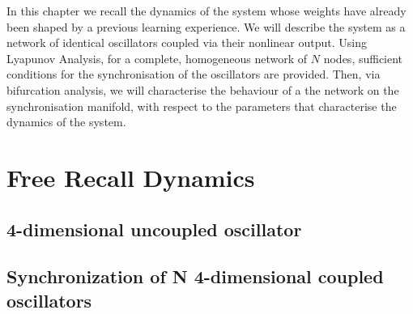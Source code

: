 In this chapter we recall the dynamics of the system whose weights have already been shaped by a previous learning experience. We will describe the system as a network of identical oscillators coupled via their nonlinear output. 
Using Lyapunov Analysis, for a complete, homogeneous network of $N$ nodes, sufficient conditions for the synchronisation of the oscillators are provided. Then, via bifurcation analysis, we will characterise the behaviour of a the network on the synchronisation manifold, with respect to the parameters that characterise the dynamics of the system. 

\section{Free Recall Dynamics}

\iffalse
\subsection{2by2 system without adaptation}

\fi
\subsection{4-dimensional uncoupled oscillator}
%

\subsection{Synchronization of N 4-dimensional coupled oscillators}
